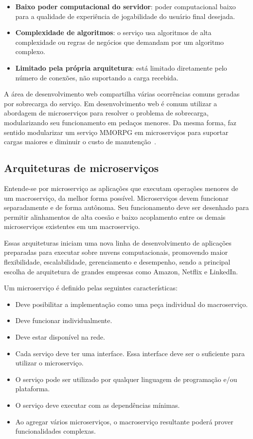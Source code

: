 \begin{itemize}
  \item \textbf{Baixo poder computacional do servidor}: poder computacional baixo para a qualidade de experiência de jogabilidade do usuário final desejada.
  \item \textbf{Complexidade de algoritmos}: o serviço usa algoritmos de alta complexidade ou regras de negócios que demandam por um algoritmo complexo.
  \item \textbf{Limitado pela própria arquitetura}: está limitado diretamente pelo número de conexões, não suportando a carga recebida.
\end{itemize}

A área de desenvolvimento web compartilha várias ocorrências comuns geradas por sobrecarga do serviço\cite{7830692}.
%
Em desenvolvimento web é comum utilizar a abordagem de microserviços para resolver o problema de sobrecarga, modularizando seu funcionamento em pedaços menores.
%
Da mesma forma, faz sentido modularizar um serviço \ac{MMORPG} em microserviços para suportar cargas maiores e diminuir o custo de manutenção~\cite{7515686}.

\subsection{Arquiteturas de microserviços}

Entende-se por microserviço as aplicações que executam operações menores de um macroserviço, da melhor forma possível\cite{stephenclarkewillson2017}.
%
Microserviços devem funcionar separadamente e de forma autônoma.
%
Seu funcionamento deve ser desenhado para permitir alinhamentos de alta coesão e baixo acoplamento entre os demais microserviços existentes em um macroserviço\cite{8169955}.



Essas arquiteturas iniciam uma nova linha de desenvolvimento de aplicações preparadas para executar sobre nuvens computacionais, promovendo maior flexibilidade, escalabilidade, gerenciamento e desempenho, sendo a principal escolha de arquitetura de grandes empresas como Amazon, Netflix e LinkedIn\cite{7830692}\cite{7515686}.

Um microserviço é definido pelas seguintes características\cite{8169955}:

\begin{itemize}
  \item Deve posibilitar a implementação como uma peça individual do macroserviço.
  \item Deve funcionar individualmente.
  \item Deve estar disponível na rede.
  \item Cada serviço deve ter uma interface. Essa interface deve ser o suficiente para utilizar o microserviço.
  \item O serviço pode ser utilizado por qualquer linguagem de programação e/ou plataforma.
  \item O serviço deve executar com as dependências mínimas.
  \item Ao agregar vários microserviços, o macroserviço resultante poderá prover funcionalidades complexas.
\end{itemize}

